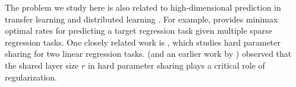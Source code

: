 The problem we study here is also related to high-dimensional prediction in transfer learning \cite{li2020transfer,bastani2020predicting} and distributed learning \cite{dobriban2018high}.
For example, \citet{li2020transfer} provides minimax optimal rates for predicting a target regression task given multiple sparse regression tasks.
One closely related work is \citet{WZR20}, which studies hard parameter sharing for two linear regression tasks.
\citet{WZR20} (and an earlier work by \citet{KD12}) observed that the shared layer size $r$ in hard parameter sharing plays a critical role of regularization.






